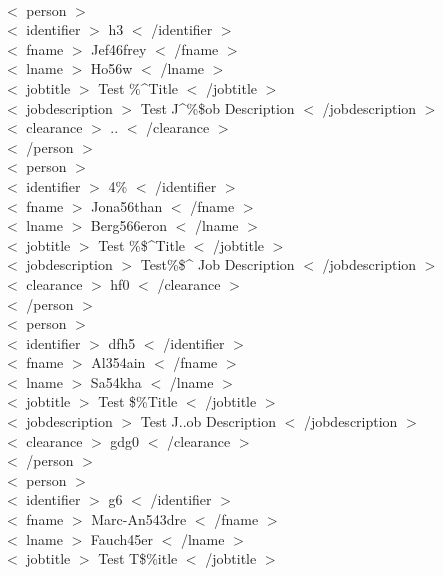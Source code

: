 \documentclass[12pt]{article}
\newcommand{\tab}{\hspace*{2em}}
\begin{document}
{\\ \tab$<$ person $>$ 
\\ \tab\tab $<$ identifier $>$ h3 $<$ /identifier $>$ 
\\ \tab\tab $<$ fname $>$ Jef46frey $<$ /fname $>$ 
\\ \tab\tab $<$ lname $>$ Ho56w $<$ /lname $>$ 
\\ \tab\tab $<$ jobtitle $>$ Test \%\^{}Title $<$ /jobtitle $>$ 
\\ \tab\tab $<$ jobdescription $>$ Test J\^{}\%\$ob Description $<$ /jobdescription $>$ 
\\ \tab\tab $<$ clearance $>$ .. $<$ /clearance $>$ 
\\ \tab$<$ /person $>$ 
\\ \tab$<$ person $>$ 
\\ \tab\tab $<$ identifier $>$ 4\% $<$ /identifier $>$ 
\\ \tab\tab $<$ fname $>$ Jona56than $<$ /fname $>$ 
\\ \tab\tab $<$ lname $>$ Berg566eron $<$ /lname $>$ 
\\ \tab\tab $<$ jobtitle $>$ Test \%\$\^{}Title $<$ /jobtitle $>$ 
\\ \tab\tab $<$ jobdescription $>$ Test\%\$\^{}  Job Description $<$ /jobdescription $>$ 
\\ \tab\tab $<$ clearance $>$ hf0 $<$ /clearance $>$ 
\\ \tab$<$ /person $>$ 
\\ \tab$<$ person $>$ 
\\ \tab\tab $<$ identifier $>$ dfh5 $<$ /identifier $>$ 
\\ \tab\tab $<$ fname $>$ Al354ain $<$ /fname $>$ 
\\ \tab\tab $<$ lname $>$ Sa54kha $<$ /lname $>$ 
\\ \tab\tab $<$ jobtitle $>$ Test \$\%Title $<$ /jobtitle $>$ 
\\ \tab\tab $<$ jobdescription $>$ Test J..ob Description $<$ /jobdescription $>$ 
\\ \tab\tab $<$ clearance $>$ gdg0 $<$ /clearance $>$ 
\\ \tab$<$ /person $>$ 
\\ \tab$<$ person $>$ 
\\ \tab\tab $<$ identifier $>$ g6 $<$ /identifier $>$ 
\\ \tab\tab $<$ fname $>$ Marc-An543dre $<$ /fname $>$ 
\\ \tab\tab $<$ lname $>$ Fauch45er $<$ /lname $>$ 
\\ \tab\tab $<$ jobtitle $>$ Test T\$\%itle $<$ /jobtitle $>$ 
}
\end{document}
